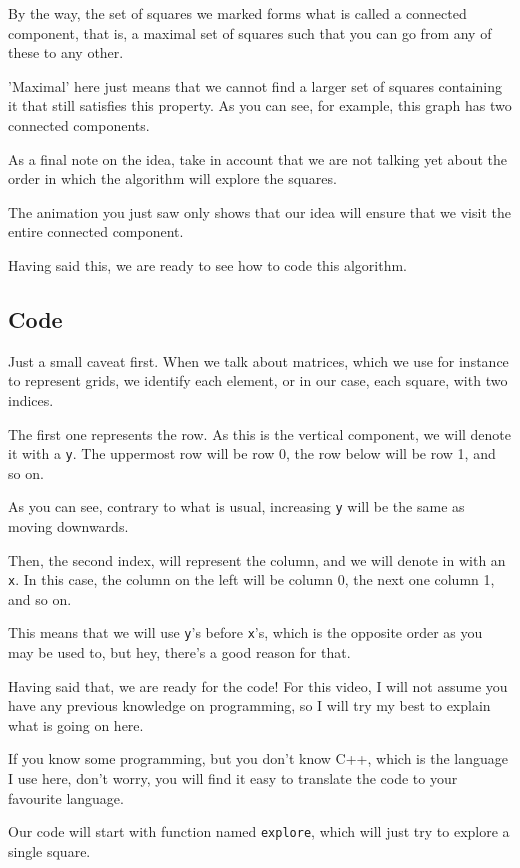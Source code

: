 \documentclass[12pt]{article}
\renewcommand{\v}[1]{\texttt{#1}}
\begin{document}
By the way, the set of squares we marked forms what is called
a connected component, that is, a maximal
set of squares such that you can go from any of these to any other.

'Maximal' here just means that we cannot find a larger set
of squares containing it that still satisfies this property.
As you can see, for example, this graph has two connected components.

As a final note on the idea, take in account that we
are not talking yet about the order in which the algorithm
will explore the squares.

The animation you just saw only shows
that our idea will ensure that we visit the entire
connected component.

Having said this, we are ready to see how
to code this algorithm.

\subsection{Code}

Just a small caveat first.
When we talk about matrices, which we use for instance to represent grids,
we identify each element, or in our case, each square,
with two indices.

The first one represents the row.
As this is the vertical component, we will denote it
with a \v{y}. The uppermost row will be row 0, the row below
will be row 1, and so on.

As you can see, contrary to what is
usual, increasing \v{y} will be the same as moving downwards.

Then, the second index, will represent the column, and we will
denote in with an \v{x}. In this case, the column on the left
will be column 0, the next one column 1, and so on.

This means that we will use \v{y}'s before \v{x}'s,
which is the opposite order as you may be used to, but hey,
there's a good reason for that.

Having said that, we are ready for the code!
For this video,
I will not assume you have any previous knowledge on programming,
so I will try my best to explain what is going on here.

If you know some programming, but you don't know C++,
which is the language I use here, don't worry,
you will find it easy to translate the code to your favourite
language.

Our code will start with function named \v{explore},
which will just try to explore a single square.
\end{document}
